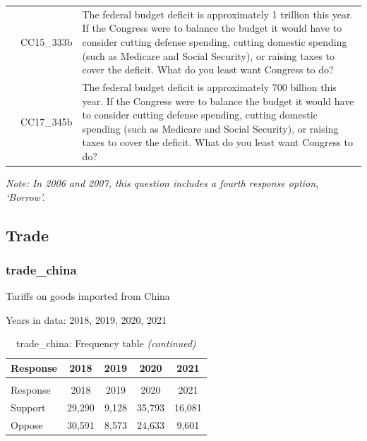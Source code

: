 \documentclass[
  12pt]{article}
\begin{document}
\begin{longtable}[t]{rl>{\raggedright\arraybackslash}p{10cm}}
\addlinespace
2015 & CC15\_333b & The federal budget deficit is approximately 1 trillion this year. If the Congress were to balance the budget it would have to consider cutting defense spending, cutting domestic spending (such as Medicare and Social Security), or raising taxes to cover the deficit. What do you least want Congress to do?\\
\addlinespace
2017 & CC17\_345b & The federal budget deficit is approximately 700 billion this year. If the Congress were to balance the budget it would have to consider cutting defense spending, cutting domestic spending (such as Medicare and Social Security), or raising taxes to cover the deficit. What do you least want Congress to do?\\*
\end{longtable}
\endgroup{}

\emph{Note: In 2006 and 2007, this question includes a fourth response
option, `Borrow'.}

\newpage

\hypertarget{trade}{%
\subsection{Trade}\label{trade}}

\hypertarget{trade_china}{%
\subsubsection{trade\_china}\label{trade_china}}

Tariffs on goods imported from China

Years in data: 2018, 2019, 2020,
2021\begingroup\fontsize{10}{12}\selectfont

\begin{longtable}[t]{lcccc}
\caption{\label{tab:unnamed-chunk-5}trade\_china: Frequency table}\\
\toprule
Response & 2018 & 2019 & 2020 & 2021\\
\midrule
\endfirsthead
\caption[]{trade\_china: Frequency table \textit{(continued)}}\\
\toprule
Response & 2018 & 2019 & 2020 & 2021\\
\midrule
\endhead

\endfoot
\bottomrule
\endlastfoot
Support & 29,290 & 9,128 & 35,793 & 16,081\\
Oppose & 30,591 & 8,573 & 24,633 & 9,601\\*
\end{longtable}
\endgroup{}
\end{document}
